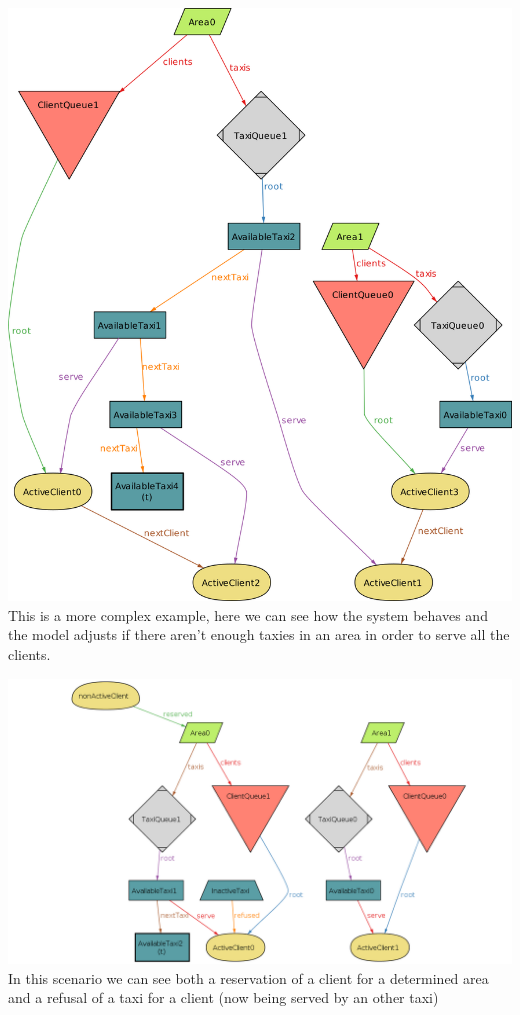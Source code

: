 \documentclass{article}
\begin{document}
\begin{center}
	\includegraphics[width=.9\textwidth,height=.9\textheight,keepaspectratio]{CrossAreaService}
	\\This is a more complex example, here we can see how the system behaves and the model adjusts if there aren't enough taxies in an area in order to serve all the clients.
\end{center}
\begin{center}
	\includegraphics[width=.9\textwidth,height=.9\textheight,keepaspectratio]{reserved-and-refused}
	\\In this scenario we can see both a reservation of a client for a determined area and a refusal of a taxi for a client (now being served by an other taxi)
\end{center}
\end{document}
